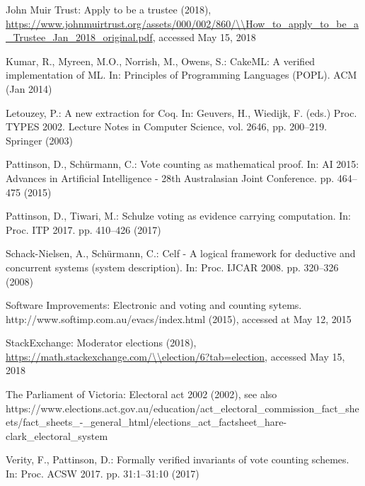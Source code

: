 \documentclass{llncs}
\begin{document}
\begin{thebibliography}{10}
{John Muir Trust}: Apply to be a trustee (2018),
  \url{https://www.johnmuirtrust.org/assets/000/002/860/\\How\_to\_apply\_to\_be\_a\_Trustee\_Jan\_2018\_original.pdf},
  accessed May 15, 2018

Kumar, R., Myreen, M.O., Norrish, M., Owens, S.: {CakeML}: A verified
  implementation of {ML}. In: Principles of Programming Languages ({POPL}). ACM
  (Jan 2014)

Letouzey, P.: A new extraction for {Coq}. In: Geuvers, H., Wiedijk, F. (eds.)
  Proc. TYPES 2002. Lecture Notes in Computer Science, vol. 2646, pp. 200--219.
  Springer (2003)

Pattinson, D., Sch{\"{u}}rmann, C.: Vote counting as mathematical proof. In:
  {AI} 2015: Advances in Artificial Intelligence - 28th Australasian Joint
  Conference. pp. 464--475 (2015)

Pattinson, D., Tiwari, M.: Schulze voting as evidence carrying computation. In:
  Proc. ITP 2017. pp. 410--426 (2017)

Schack{-}Nielsen, A., Sch{\"{u}}rmann, C.: Celf - {A} logical framework for
  deductive and concurrent systems (system description). In: Proc. IJCAR 2008.
  pp. 320--326 (2008)

{Software Improvements}: Electronic and voting and counting sytems.
  http://www.softimp.com.au/evacs/index.html (2015), accessed at May 12, 2015

StackExchange: Moderator elections (2018),
  \url{https://math.stackexchange.com/\\election/6?tab=election}, accessed May
  15, 2018

{The Parliament of Victoria}: Electoral act 2002 (2002), see also
  https://www.elections.act.gov.au/education/act\_electoral\_commission\_fact\_sheets/fact\_sheets\_-\_general\_html/elections\_act\_factsheet\_hare-clark\_electoral\_system

Verity, F., Pattinson, D.: Formally verified invariants of vote counting
  schemes. In: Proc. ACSW 2017. pp. 31:1--31:10 (2017)

\end{thebibliography}
\end{document}
